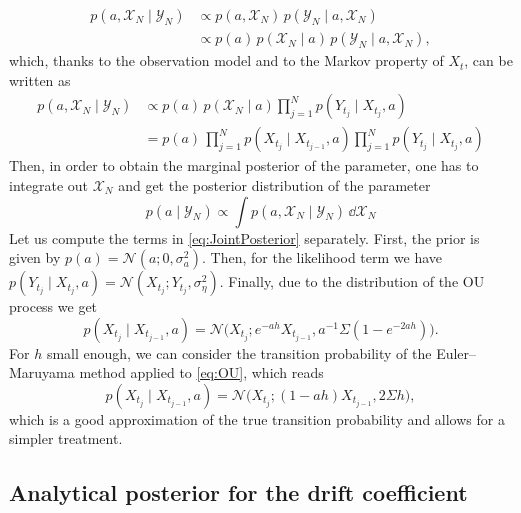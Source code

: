 \documentclass[10pt]{article}
\begin{document}
\begin{equation}
\begin{aligned}
	p(a, \mathcal X_N \mid \mathcal Y_N) &\propto p(a, \mathcal X_N) \, p(\mathcal Y_N \mid a, \mathcal X_N)\\
	&\propto p(a) \, p(\mathcal X_N \mid a) \, p(\mathcal Y_N \mid a, \mathcal X_N),
\end{aligned}
\end{equation}
which, thanks to the observation model and to the Markov property of $X_t$, can be written as
\begin{equation}\label{eq:JointPosterior}
\begin{aligned}
	p(a, \mathcal X_N \mid \mathcal Y_N) &\propto p(a) \, p(\mathcal X_N \mid a) \prod_{j=1}^{N} p(Y_{t_j} \mid X_{t_j}, a)\\
	&= p(a) \, \prod_{j=1}^{N} p(X_{t_j} \mid X_{t_{j-1}}, a) \prod_{j=1}^{N} p(Y_{t_j} \mid X_{t_j}, a)
\end{aligned}
\end{equation}
Then, in order to obtain the marginal posterior of the parameter, one has to integrate out $\mathcal X_N$ and get the posterior distribution of the parameter
\begin{equation}\label{eq:MarginalPosterior}
	p(a \mid \mathcal Y_N) \propto \int p(a, \mathcal X_N \mid \mathcal Y_N) \, \dd \mathcal X_N
\end{equation}
Let us compute the terms in \eqref{eq:JointPosterior} separately. First, the prior is given by $p(a) = \mathcal N(a; 0, \sigma^2_a)$. Then, for the likelihood term we have $p(Y_{t_j} \mid X_{t_j}, a) = \mathcal N(X_{t_j}; Y_{t_j}, \sigma_\eta^2)$. Finally, due to the distribution of the OU process we get
\begin{equation}
	p(X_{t_j} \mid X_{t_{j-1}}, a) = \mathcal N\big(X_{t_j}; e^{-ah}X_{t_{j-1}}, a^{-1}\Sigma(1 - e^{-2ah})\big).
\end{equation}
For $h$ small enough, we can consider the transition probability of the Euler--Maruyama method applied to \eqref{eq:OU}, which reads
\begin{equation}
	p(X_{t_j} \mid X_{t_{j-1}}, a) = \mathcal N\big(X_{t_j}; (1-ah)X_{t_{j-1}}, 2\Sigma h\big),
\end{equation}
which is a good approximation of the true transition probability and allows for a simpler treatment. 

\subsection*{Analytical posterior for the drift coefficient}
\end{document}
